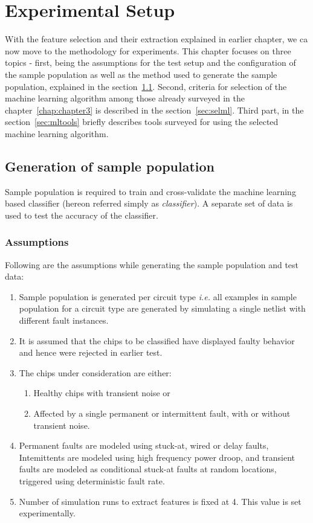 \chapter{Experimental Setup}
\label{chap:chapter5}
With the feature selection and their extraction explained in earlier chapter, we ca now move to the methodology for experiments. This chapter focuses on three topics - first, being the assumptions for the test setup and the configuration of the sample population as well as the method used to generate the sample population, explained in the section~\ref{sec:gsp}. Second, criteria for selection of the machine learning algorithm among those already surveyed in the chapter~\ref{chap:chapter3} is described in the section~\ref{sec:selml}. Third part, in the section~\ref{sec:mltools} briefly describes tools surveyed for using the selected machine learning algorithm.
\section{Generation of sample population}
\label{sec:gsp}
Sample population is required to train and cross-validate the machine learning based classifier (hereon referred simply as \emph{classifier}). A separate set of data is used to test the accuracy of the classifier.
\subsection{Assumptions}
\label{sec:gsp:assumptions}
Following are the assumptions while generating the sample population and test data:
\begin{enumerate}
  \item Sample population is generated per circuit type \emph{i.e.} all examples in sample population for a circuit type are generated by simulating a single netlist with different fault instances. 
  \item It is assumed that the chips to be classified have displayed faulty behavior and hence were rejected in earlier test.
  \item The chips under consideration are either:
		  \begin{enumerate}
    		\item Healthy chips with transient noise or
    		\item Affected by a single permanent or intermittent fault, with or without transient noise.
 		 \end{enumerate}
	\item Permanent faults are modeled using stuck-at, wired or delay faults, Intemittents are modeled using high frequency power droop, and transient faults are modeled as conditional stuck-at faults at random locations, triggered using deterministic fault rate.
	\item Number of simulation runs to extract features is fixed at 4. This value is set experimentally. 
\end{enumerate}

